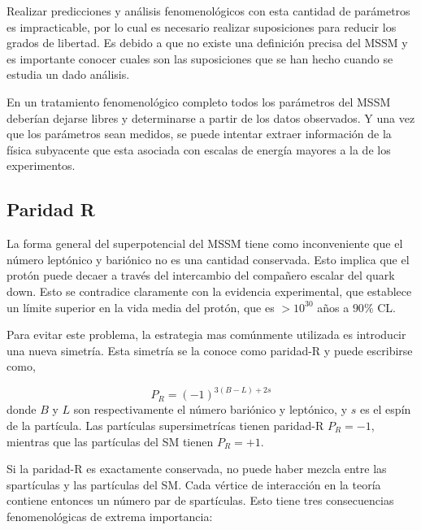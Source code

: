 Realizar predicciones y análisis fenomenológicos con esta cantidad de parámetros es
impracticable, por lo cual es necesario realizar suposiciones para
reducir los grados de libertad. Es debido a que no existe una definición
precisa del MSSM y es importante conocer cuales son las suposiciones que se han
hecho cuando se estudia un dado análisis.

En un tratamiento fenomenológico completo todos los parámetros del MSSM deberían
dejarse libres y determinarse a partir de los datos observados. Y una vez que los
parámetros sean medidos, se puede intentar extraer información de la física
subyacente que esta asociada con escalas de energía mayores a la de los
experimentos.



\subsection{Paridad R}

La forma general del superpotencial del MSSM tiene como inconveniente que el
número leptónico y bariónico no es una cantidad conservada. Esto implica que el
protón puede decaer a través del intercambio del compañero escalar del quark
down. Esto se contradice claramente con la evidencia experimental, que establece
un límite superior en la vida media del protón, que es $> 10^{30}$ a\~nos a $90\%$ CL\cite{PDG}.

Para evitar este problema, la estrategia mas comúnmente utilizada es introducir
una nueva simetría. Esta simetría se la conoce como paridad-R y puede escribirse
como,

\begin{equation}
  P_R = (-1)^{3(B-L)+ 2s}
\end{equation}
%
donde $B$ y $L$ son respectivamente el número bariónico y leptónico, y $s$ es el
espín de la partícula. Las partículas supersimetrícas tienen paridad-R $P_R = -1$, mientras
que las partículas del SM tienen $P_R = +1$.

Si la paridad-R es exactamente conservada, no puede haber mezcla entre las
spartículas y las partículas del SM. Cada vértice de interacción en la
teoría contiene entonces un número par de spartículas. Esto tiene tres consecuencias
fenomenológicas de extrema importancia:

